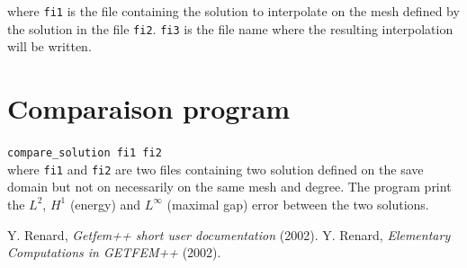 \documentclass[11pt,a4paper]{article}
\begin{document}
where {\tt fi1} is the file containing the solution to interpolate on the mesh defined by the solution in the file {\tt fi2}. {\tt fi3} is the file name where the resulting interpolation will be written. 

\section{Comparaison program}

{\tt compare\_solution fi1 fi2} \\[0.5cm]

where {\tt fi1} and {\tt fi2} are two files containing two solution defined on the save domain but not on necessarily on the same mesh and degree. The program print the $L^2$, $H^1$ (energy) and $L^{\infty}$ (maximal gap) error between the two solutions. 

\begin{thebibliography}{99}
% 
% 
% 
  Y. {\sc Renard},
  {\it Getfem++ short user documentation} (2002).
  Y. {\sc Renard},
  {\it Elementary Computations in GETFEM++} (2002).
\end{thebibliography}
\end{document}
